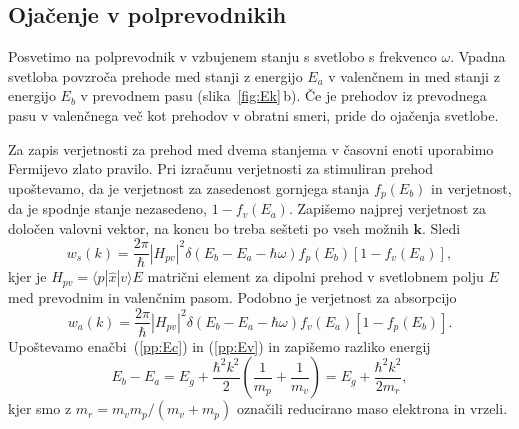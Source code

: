 \subsection*{Ojačenje v polprevodnikih}
Posvetimo na polprevodnik v vzbujenem stanju s svetlobo s frekvenco $\omega$.
Vpadna svetloba povzroča prehode med stanji z energijo $E_a$ v valenčnem 
in med stanji z energijo $E_b$ v prevodnem pasu (slika~\ref{fig:Ek}\,b).
Če je prehodov iz prevodnega pasu v valenčnega več kot prehodov v obratni
smeri, pride do ojačenja svetlobe. 

Za zapis verjetnosti za prehod med dvema stanjema v časovni
enoti uporabimo Fermijevo zlato pravilo. Pri izračunu verjetnosti
za stimuliran prehod upoštevamo, da je verjetnost za zasedenost gornjega stanja 
$f_p(E_b)$ in verjetnost, da je spodnje stanje nezasedeno, $1-f_v(E_a)$. Zapišemo
najprej verjetnost za določen valovni vektor, na koncu bo treba sešteti
po vseh možnih $\mathbf{k}$. Sledi
\begin{equation}  
w_s(k)=\frac{2\pi}{\hbar}|H_{pv}|^2\delta(E_b-E_a- \hbar\omega)
f_p(E_b)[1-f_v(E_a)],
\label{6.5}
\end{equation}
kjer je $H_{pv}= \langle p| \hat{x}|v\rangle E $ matrični element za dipolni
prehod v svetlobnem polju $E$ med prevodnim in valenčnim pasom. Podobno je
verjetnost za absorpcijo 
\begin{equation}  
w_a(k)=\frac{2\pi}{\hbar}|H_{pv}|^2\delta(E_b-E_a- \hbar\omega)
f_v(E_a)[1-f_p(E_b)].
\label{6.6}
\end{equation}
Upoštevamo enačbi~(\ref{pp:Ec}) in (\ref{pp:Ev}) in zapišemo razliko energij
\begin{equation}  
E_b-E_a= E_g + \frac{\hbar^2 k^2}{2}(\frac{1}{m_p}+ \frac{1}{m_v})= E_g + \frac{\hbar^2 k^2}{2m_r},
\label{6.8}
\end{equation}
kjer smo z $m_r=m_v m_p/(m_v+m_p)$ označili reducirano maso elektrona in vrzeli.

